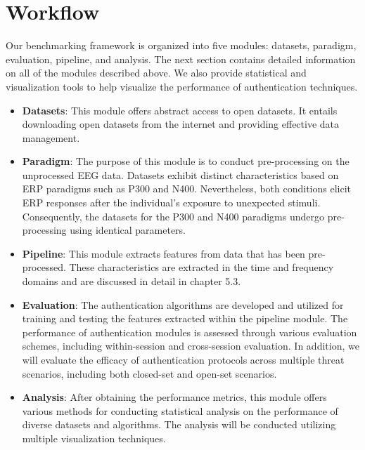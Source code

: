 \section{Workflow}
\label{sec:Solution Approach:Workflow}

Our benchmarking framework is organized into five modules: datasets, paradigm, evaluation, pipeline, and analysis. The next section contains detailed information on all of the modules described above. We also provide statistical and visualization tools to help visualize the performance of authentication techniques.
\begin{itemize}

\item \textbf{Datasets}: This module offers abstract access to open datasets.  It entails downloading open datasets from the internet and providing effective data management. 

\item \textbf{Paradigm}: The purpose of this module is to conduct pre-processing on the unprocessed EEG data. Datasets exhibit distinct characteristics based on ERP paradigms such as P300 and N400. Nevertheless, both conditions elicit ERP responses after  the individual's exposure to unexpected stimuli. Consequently, the datasets for the P300 and N400 paradigms undergo pre-processing using identical parameters. 


\item \textbf{Pipeline}: This module extracts features from data that has been pre-processed. These characteristics are extracted in the time and frequency domains and are discussed in detail in chapter 5.3.   

\item \textbf{Evaluation}:  The authentication algorithms are developed and utilized for training and testing the features extracted within the pipeline module. The performance of authentication modules is assessed through various evaluation schemes, including within-session and cross-session evaluation. In addition, we will evaluate the efficacy of authentication protocols across multiple threat scenarios, including both closed-set and open-set scenarios. 

\item \textbf{Analysis}: After obtaining the performance metrics, this module offers various methods for conducting statistical analysis on the performance of diverse datasets and algorithms. The analysis will be conducted utilizing multiple visualization techniques.
\end{itemize}

